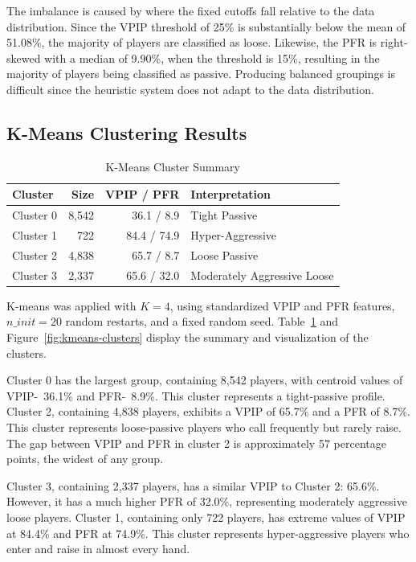 \documentclass[sigconf]{acmart}
\begin{document}
The imbalance is caused by where the fixed cutoffs fall relative to the data distribution. Since the VPIP threshold of 25\% is substantially below the mean of 51.08\%, the majority of players are classified as loose. Likewise, the PFR is right-skewed with a median of 9.90\%, when the threshold is 15\%, resulting in the majority of players being classified as passive. Producing balanced groupings is difficult since the heuristic system does not adapt to the data distribution. 

\subsection{K-Means Clustering Results}
\begin{table}[t]
  \caption{K-Means Cluster Summary}
  \label{tab:kmeans-summary}
  \centering
  \begin{tabular}{lrrl}
    \toprule
    Cluster & Size & VPIP / PFR & Interpretation \\
    \midrule
    Cluster 0 & 8,542 & 36.1 / 8.9 & Tight Passive \\
    Cluster 1 & 722 & 84.4 / 74.9 & Hyper-Aggressive \\
    Cluster 2 & 4,838 & 65.7 / 8.7 & Loose Passive \\
    Cluster 3 & 2,337 & 65.6 / 32.0 & Moderately Aggressive Loose \\
    \bottomrule
  \end{tabular}
\end{table}

K-means was applied with $K=4$, using standardized VPIP and PFR features, $n\_init=20$ random restarts, and a fixed random seed. Table~\ref{tab:kmeans-summary} and Figure~\ref{fig:kmeans-clusters} display the summary and visualization of the clusters. 

Cluster 0 has the largest group, containing 8,542 players, with centroid values of VPIP-~36.1\% and PFR-~8.9\%. This cluster represents a tight-passive profile. Cluster 2, containing 4,838 players, exhibits a VPIP of 65.7\% and a PFR of 8.7\%. This cluster represents loose-passive players who call frequently but rarely raise. The gap between VPIP and PFR in cluster 2 is approximately 57 percentage points, the widest of any group.

Cluster 3, containing 2,337 players, has a similar VPIP to Cluster 2: 65.6\%. However, it has a much higher PFR of 32.0\%, representing moderately aggressive loose players. Cluster 1, containing only 722 players, has extreme values of VPIP at 84.4\% and PFR at 74.9\%. This cluster represents hyper-aggressive players who enter and raise in almost every hand. 
\end{document}
